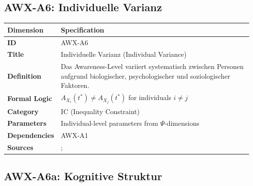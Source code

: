 
\subsection{AWX-A6: Individuelle Varianz}

\begin{table}[htbp]
\small
\begin{tabular}{p{3cm}p{11cm}}
\toprule
\textbf{Dimension} & \textbf{Specification} \\
\midrule
\textbf{ID} & AWX-A6 \\
\textbf{Title} & Individuelle Varianz (Individual Variance) \\
\textbf{Definition} & Das Awareness-Level variiert systematisch zwischen Personen aufgrund biologischer, psychologischer und soziologischer Faktoren. \\
\textbf{Formal Logic} & $A_{X_i}(t^*) \neq A_{X_j}(t^*)$ for individuals $i \neq j$ \\
\textbf{Category} & IC (Inequality Constraint) \\
\textbf{Parameters} & Individual-level parameters from $\Psi$-dimensions \\
\textbf{Dependencies} & AWX-A1 \\
\textbf{Sources} & \citet{heckman2006effects}; \citet{cunha2007technology} \\
\bottomrule
\end{tabular}
\end{table}


\subsection{AWX-A6a: Kognitive Struktur}

